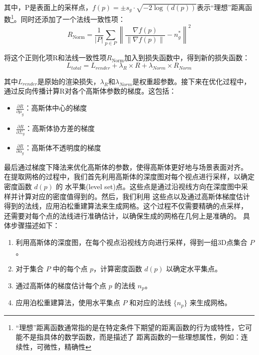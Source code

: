 \documentclass{nwputhesis}
\begin{document}
\indent
其中，P是表面上的采样点，$f(p)=\pm s_g \cdot \sqrt{-2 \log(d(p))}$表示“理想”距离函数\footnote{
“理想”距离函数通常指的是在特定条件下期望的距离函数的行为或特性，它可能不是指具体的数学函数，而是描述了
距离函数的一些理想属性，例如：连续性，可微性，精确性}。同时还添加了一个法线一致性项：
\begin{equation}
    R_{\text{Norm}} = \frac{1}{|P|} \sum_{p \in P} \left\| \frac{\nabla f(p)}{\|\nabla f(p)\|} - n_g^* \right\|^2 
\end{equation}

\indent
将这个正则化项R和法线一致性项$R_{\text{Norm}}$加入到损失函数中，得到新的损失函数：
\begin{equation}
    L_{total} = L_{render} + \lambda_R \times R + \lambda_{Norm} \times R_{Norm}
\end{equation}

\indent
其中$L_{render}$是原始的渲染损失，$\lambda_R$和$\lambda_{Norm}$是权重超参数。接下来在优化过程中，
通过反向传播计算R对各个高斯体参数的梯度。这包括：
\begin{itemize}
    \item $\frac{\partial R}{\partial \mu_g}$：高斯体中心的梯度
    \item $\frac{\partial R}{\partial \Sigma_g}$：高斯体协方差的梯度
    \item $\frac{\partial R}{\partial \alpha_g}$：高斯体不透明度的梯度
\end{itemize}

\indent
最后通过梯度下降法来优化高斯体的参数，使得高斯体更好地与场景表面对齐。\\

\indent
在提取网格的过程中，我们首先利用高斯体的深度图对每个视点进行采样，以确定密度函数 \( d(p) \) 的
水平集(level set)点。这些点是通过沿视线方向在深度图中采样并计算对应的密度值得到的。然后，我们利用
这些点以及通过高斯体梯度估计得到的法线，应用泊松重建算法来生成网格。这个过程不仅需要精确的点采样，
还需要对每个点的法线进行准确估计，以确保生成的网格在几何上是准确的。
具体步骤描述如下：
\begin{enumerate}
    \item 利用高斯体的深度图，在每个视点沿视线方向进行采样，得到一组3D点集合 \( P \)。
    \item 对于集合 \( P \) 中的每个点 \( p \)，计算密度函数 \( d(p) \) 以确定水平集点。
    \item 通过高斯体的梯度估计每个点 \( p \) 的法线 \( n_p \)。
    \item 应用泊松重建算法，使用水平集点 \( P \) 和对应的法线 \( \{n_p\} \) 来生成网格。
\end{enumerate}
\end{document}
